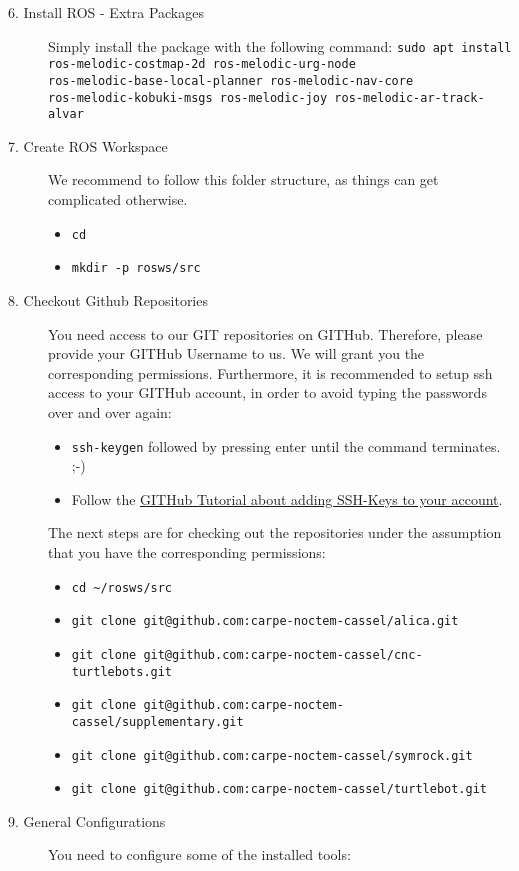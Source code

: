 \begin{description}
	\item[6. Install ROS - Extra Packages] Simply install the package with the following command: \verb#sudo apt install ros-melodic-costmap-2d ros-melodic-urg-node #\\\verb#ros-melodic-base-local-planner ros-melodic-nav-core#\\\verb#ros-melodic-kobuki-msgs ros-melodic-joy ros-melodic-ar-track-alvar#
	\item[7. Create ROS Workspace] We recommend to follow this folder structure, as things can get complicated otherwise. 
	\begin{itemize}
		\item \verb#cd#
		\item \verb#mkdir -p rosws/src#
	\end{itemize}
	\item[8. Checkout Github Repositories] You need access to our GIT repositories on GITHub. Therefore, please provide your GITHub Username to us. We will grant you the corresponding permissions. Furthermore, it is recommended to setup ssh access to your GITHub account, in order to avoid typing the passwords over and over again:
	\begin{itemize}
		\item \verb#ssh-keygen# followed by pressing enter until the command terminates. ;-)
		\item Follow the \href{https://help.github.com/articles/adding-a-new-ssh-key-to-your-github-account/}{GITHub Tutorial about adding SSH-Keys to your account}.
	\end{itemize}
	The next steps are for checking out the repositories under the assumption that you have the corresponding permissions:
	\begin{itemize}
		\item \verb#cd ~/rosws/src#
		\item \verb#git clone git@github.com:carpe-noctem-cassel/alica.git#
		\item \verb#git clone git@github.com:carpe-noctem-cassel/cnc-turtlebots.git#
		\item \verb#git clone git@github.com:carpe-noctem-cassel/supplementary.git#
		\item \verb#git clone git@github.com:carpe-noctem-cassel/symrock.git#
		\item \verb#git clone git@github.com:carpe-noctem-cassel/turtlebot.git#
	\end{itemize}
	\item[9. General Configurations] You need to configure some of the installed tools:

\end{description}
